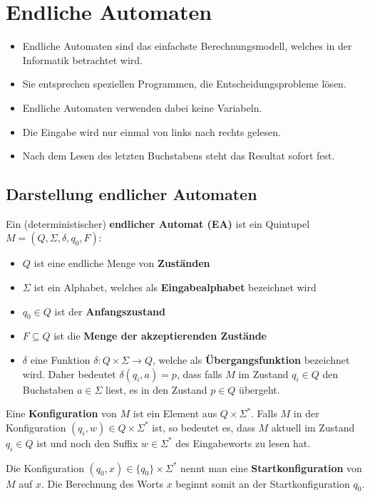 \chapter{Endliche Automaten}
\begin{itemize}
  \item Endliche Automaten sind das einfachste Berechnungsmodell, welches in der Informatik betrachtet wird.
  \item Sie entsprechen speziellen Programmen, die Entscheidungsprobleme lösen.
  \item Endliche Automaten verwenden dabei keine Variabeln.
  \item Die Eingabe wird nur einmal von links nach rechts gelesen.
  \item Nach dem Lesen des letzten Buchstabens steht das Resultat sofort fest.
\end{itemize}

\section{Darstellung endlicher Automaten}
\begin{definition}
Ein (deterministischer) \textbf{endlicher Automat (EA)} ist ein Quintupel $M = (Q, \Sigma, \delta, q_0, F)$:
\begin{itemize}
  \item $Q$ ist eine endliche Menge von \textbf{Zuständen}
  \item $\Sigma$ ist ein Alphabet, welches als \textbf{Eingabealphabet} bezeichnet wird
  \item $q_0 \in Q$ ist der \textbf{Anfangszustand}
  \item $F \subseteq Q$ ist die \textbf{Menge der akzeptierenden Zustände}
  \item $\delta$ eine Funktion $\delta: Q \times \Sigma \to Q$, welche als \textbf{Übergangsfunktion} bezeichnet wird. Daher bedeutet $\delta(q_i, a) = p$, dass falls $M$ im Zustand $q_i \in Q$ den Buchstaben $a \in \Sigma$ liest, es in den Zustand $p \in Q$ übergeht.\\
\end{itemize}

\end{definition}

\begin{definition}
Eine \textbf{Konfiguration} von $M$ ist ein Element aus $Q \times \Sigma^*$. Falls $M$ in der Konfiguration $(q_i, w) \in Q \times \Sigma^*$ ist, so bedeutet es, dass $M$ aktuell im Zustand $q_i \in Q$ ist und noch den Suffix $w \in \Sigma^*$ des Eingabeworts zu lesen hat.

Die Konfiguration $(q_0, x) \in \{q_0\} \times \Sigma^*$ nennt man eine \textbf{Startkonfiguration} von $M$ auf $x$. Die Berechnung des Worts $x$ beginnt somit an der Startkonfiguration $q_0$.\\
\end{definition}

